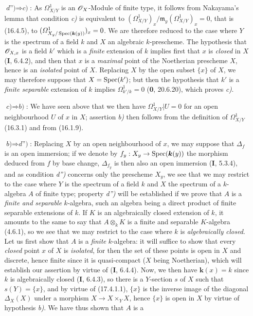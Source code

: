 $\textit{d'')}\Rightarrow\textit{c)}$: As $\varOmega^1_{X/Y}$ is an $\mathscr{O}_X$-Module of finite type, it follows from Nakayama's lemma that condition \emph{c)} is equivalent to $(\varOmega^1_{X/Y})_x/\mathfrak{m}_y(\varOmega^1_{X/Y})_x=0$, that is (16.4.5), to $(\varOmega^1_{X_y/\operatorname{Spec}(\boldsymbol{k}(y))})_x=0$. We are therefore reduced to the case where $Y$ is the spectrum of a field $k$ and $X$ an algebraic $k$-prescheme. The hypothesis that $\mathscr{O}_{X,x}$ is a field $k'$ which is a \emph{finite} extension of $k$ implies first that $x$ is \emph{closed} in $X$ (\textbf{I}, 6.4.2), and then that $x$ is a \emph{maximal} point of the Noetherian prescheme $X$, hence is an \emph{isolated} point of $X$. Replacing $X$ by the open subset $\{x\}$ of $X$, we may therefore suppose that $X=\operatorname{Spec}(k')$; but then the hypothesis that $k'$ is a \emph{finite separable} extension of $k$ implies $\Omega^1_{k'/k}=0$ (\textbf{0}, 20.6.20), which proves \emph{c)}.

$\textit{c)}\Rightarrow\textit{b)}$: We have seen above that we then have $\varOmega^1_{X/Y}|U=0$ for an open neighbourhood $U$ of $x$ in $X$; assertion \emph{b)} then follows from the definition of $\varOmega^1_{X/Y}$ (16.3.1) and from (16.1.9).

$\textit{b)}\Rightarrow\textit{d'')}$: Replacing $X$ by an open neighbourhood of $x$, we may suppose that $\Delta_f$ is an open immersion; if we denote by $f_y:X_y\to\operatorname{Spec}(\boldsymbol{k}(y))$ the morphism deduced from $f$ by base change, $\Delta_{f_y}$ is then also an open immersion (\textbf{I}, 5.3.4), and as condition \emph{d'')} concerns only the prescheme $X_y$, we see that we may restrict to the case where $Y$ is the spectrum of a field $k$ and $X$ the spectrum of a $k$-algebra $A$ of finite type; property \emph{d'')} will be established if we prove that $A$ is a \emph{finite and separable} $k$-algebra, such an algebra being a direct product of finite separable extensions of $k$. If $K$ is an algebraically closed extension of $k$, it amounts to the same to say that $A\otimes_k K$ is a finite and separable $K$-algebra (4.6.1), so we see that we may restrict to the case where $k$ is \emph{algebraically closed}. Let us first show that $A$ is a \emph{finite} $k$-algebra: it will suffice to show that every \emph{closed} point $x$ of $X$ is \emph{isolated}, for then the set of these points is open in $X$ and discrete, hence finite since it is quasi-compact ($X$ being Noetherian), which will establish our assertion by virtue of (\textbf{I}, 6.4.4). Now, we then have $\boldsymbol{k}(x)=k$ since $k$ is algebraically closed (\textbf{I}, 6.4.3), so there is a $Y$-section $s$ of $X$ such that $s(Y)=\{x\}$, and by virtue of (17.4.1.1), $\{x\}$ is the inverse image of the diagonal $\Delta_X(X)$ under a morphism $X\to X\times_Y X$, hence $\{x\}$ is open in $X$ by virtue of hypothesis \emph{b)}. We have thus shown that $A$ is a


